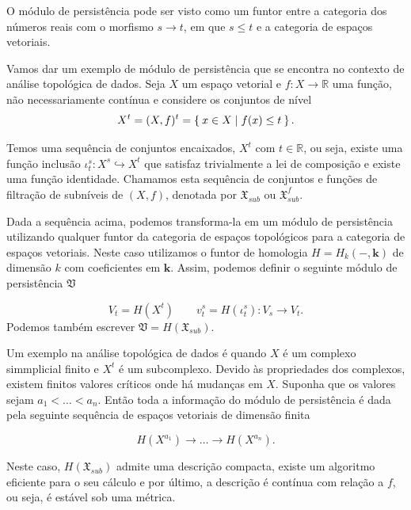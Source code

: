 O módulo de persistência pode ser visto como um funtor entre a categoria dos números reais com o morfismo
$s \to t$, em que $s \leq t$ e a categoria de espaços vetoriais. 

Vamos dar um exemplo de módulo de persistência que se encontra no contexto de análise topológica de dados. 
Seja $X$ um espaço vetorial e $f \colon X \to \mathbb{R}$ uma função, não necessariamente contínua e 
considere os conjuntos de nível
\begin{equation*}
    X^t = (X,f)^t = \Set{x \in X \mid f(x) \leq t}.
\end{equation*}

Temos uma sequência de conjuntos encaixados, $X^t$ com $t \in \mathbb{R}$, ou seja, existe uma função 
inclusão $\iota_t^s \colon X^s \hookrightarrow X^t$ que satisfaz trivialmente a lei de composição e 
existe uma função identidade. Chamamos esta sequência de conjuntos e funções de filtração de subníveis
de $(X,f)$, denotada por $\mathfrak{X}_{sub}$ ou $\mathfrak{X}^f_{sub}$.

Dada a sequência acima, podemos transforma-la em um módulo de persistência utilizando qualquer funtor
da categoria de espaços topológicos para a categoria de espaços vetoriais. Neste caso utilizamos 
o funtor de homologia $H = H_k(-, \mathbf{k})$ de dimensão $k$ com coeficientes em $\mathbf{k}$. Assim,
podemos definir o seguinte módulo de persistência $\mathfrak{V}$

\begin{equation*}
    V_t = H(X^t) \qquad v^s_t = H(\iota_t^s) \colon V_s \to V_t.
\end{equation*}
Podemos também escrever $\mathfrak{V} = H(\mathfrak{X}_{sub})$. 

Um exemplo na análise topológica de dados é quando $X$ é um complexo simmplicial finito e $X^t$ é um 
subcomplexo. Devido às propriedades dos complexos, existem finitos valores críticos onde há mudanças 
em $X$. Suponha que os valores sejam $a_1 < \dots < a_n$. Então toda a informação do módulo de 
persistência é dada pela seguinte sequência de espaços vetoriais de dimensão finita

\begin{equation*}
    H(X^{a_1}) \to \dots \to H(X^{a_n}).
\end{equation*}

Neste caso, $H(\mathfrak{X}_{sub})$ admite uma descrição compacta, existe um algoritmo eficiente para 
o seu cálculo e por último, a descrição é contínua com relação a $f$, ou seja, é estável sob uma 
métrica. 

